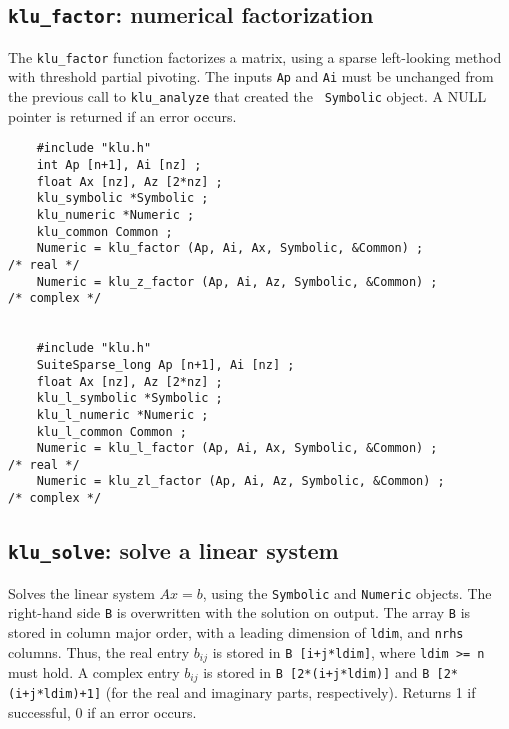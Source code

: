 \documentclass[11pt]{article}
\begin{document}
\subsection{{\tt klu\_factor}: numerical factorization}

The {\tt klu\_factor} function factorizes a matrix, using a sparse left-looking
method with threshold partial pivoting.  The inputs {\tt Ap} and {\tt Ai} must
be unchanged from the previous call to {\tt klu\_analyze} that created the {\tt
Symbolic} object.  A NULL pointer is returned if an error occurs.

{\footnotesize
\begin{verbatim}
    #include "klu.h"
    int Ap [n+1], Ai [nz] ;
    float Ax [nz], Az [2*nz] ;
    klu_symbolic *Symbolic ;
    klu_numeric *Numeric ;
    klu_common Common ;
    Numeric = klu_factor (Ap, Ai, Ax, Symbolic, &Common) ;                            /* real */
    Numeric = klu_z_factor (Ap, Ai, Az, Symbolic, &Common) ;                          /* complex */


    #include "klu.h"
    SuiteSparse_long Ap [n+1], Ai [nz] ;
    float Ax [nz], Az [2*nz] ;
    klu_l_symbolic *Symbolic ;
    klu_l_numeric *Numeric ;
    klu_l_common Common ;
    Numeric = klu_l_factor (Ap, Ai, Ax, Symbolic, &Common) ;                          /* real */
    Numeric = klu_zl_factor (Ap, Ai, Az, Symbolic, &Common) ;                         /* complex */
\end{verbatim}
}

\subsection{{\tt klu\_solve}: solve a linear system}

Solves the linear system $Ax=b$, using the {\tt Symbolic} and  {\tt Numeric}
objects.  The right-hand side {\tt B} is overwritten with the solution on
output.  The array {\tt B} is stored in column major order, with a leading
dimension of {\tt ldim}, and {\tt nrhs} columns.  Thus, the real entry $b_{ij}$
is stored in {\tt B [i+j*ldim]}, where {\tt ldim >= n} must hold.  A complex
entry $b_{ij}$ is stored in {\tt B [2*(i+j*ldim)]} and {\tt B [2*(i+j*ldim)+1]}
(for the real and imaginary parts, respectively).  Returns 1 if successful,
0 if an error occurs.
\end{document}
